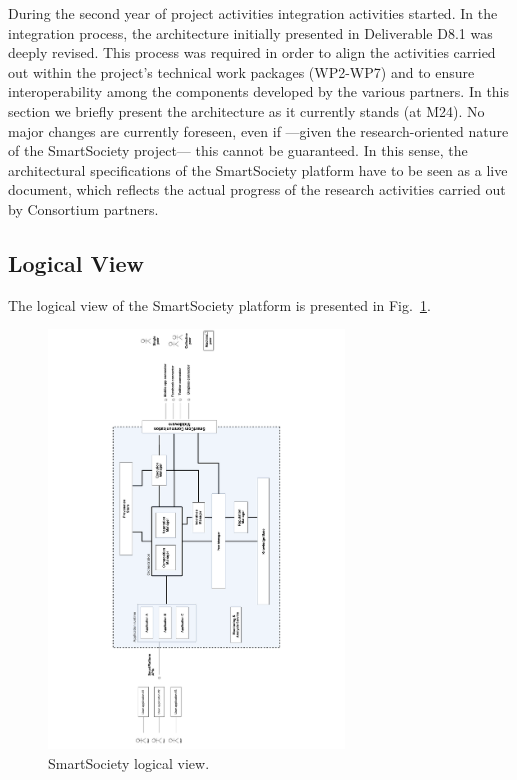 During the second year of project activities integration activities
started. In the integration process, the architecture initially
presented in Deliverable D8.1 was deeply revised. This process was
required in order to align the activities carried out within the
project's technical work packages (WP2-WP7) and to ensure
interoperability among the components developed by the various
partners. In this section we briefly present the architecture as it
currently stands (at M24). No major changes are currently foreseen,
even if ---given the research-oriented nature of the SmartSociety
project--- this cannot be guaranteed. In this sense, the architectural
specifications of the SmartSociety platform have to be seen as a live document, which reflects the
actual progress of the research activities carried out by Consortium
partners. 

\subsection{Logical View}
The logical view of the SmartSociety platform is presented in Fig.~\ref{fig:logical_view}. %

\begin{figure}[!hbt]
 \centering
 \includegraphics[width=0.7\textwidth, angle = -90]{figs/logical_view.pdf}
 \caption{SmartSociety logical view.}
 \label{fig:logical_view}
\end{figure}

